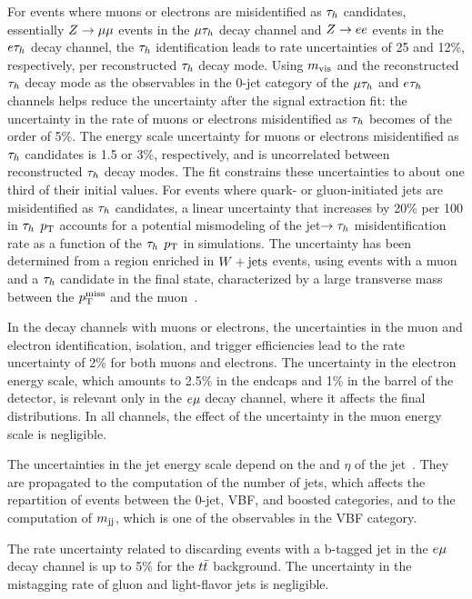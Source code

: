 For events where muons or electrons are misidentified as $\tau_{h}$ candidates, essentially $Z\to \mu\mu$ events in 
the $\mu\tau_{h}$ decay channel and $Z\to ee$ events in the $e\tau_{h}$ decay channel, the $\tau_{h}$ identification leads 
to rate uncertainties of 25 and 12\%, respectively, per reconstructed $\tau_{h}$ decay mode. Using $m_\text{vis}$ and the reconstructed 
$\tau_{h}$ decay mode as the observables in the 0-jet category of the $\mu\tau_{h}$ and $e\tau_{h}$ channels helps reduce the 
uncertainty after the signal extraction fit: the uncertainty in the rate of muons or electrons misidentified as $\tau_{h}$ 
becomes of the order of 5\%. The energy scale uncertainty for muons or electrons
 misidentified as $\tau_{h}$ candidates is 1.5 or 3\%, respectively, and is uncorrelated between reconstructed $\tau_{h}$ decay
modes. The fit constrains these uncertainties to about one third of their initial values. For events where quark- or 
gluon-initiated jets are misidentified as $\tau_{h}$ candidates, a linear uncertainty that increases by 20\% per 100\GeV 
in $\tau_{h}$ $p_\mathrm{T}$ accounts for a potential mismodeling of the jet$\to\tau_{h}$ misidentification rate as a
function of the $\tau_{h}$ $p_\mathrm{T}$ in simulations. The uncertainty has been determined from a region enriched in $W+\text{jets}$ 
events, using events with a muon and a $\tau_{h}$ candidate in the final state, characterized by a large transverse mass 
between the $p_\mathrm{T}^\text{miss}$ and the muon~\cite{Khachatryan:2015dfa,CMS-PAS-TAU-16-002}.

In the decay channels with muons or electrons, the uncertainties in the muon and electron identification, isolation, and 
trigger efficiencies lead to the rate uncertainty of 2\% for both muons and electrons.
The uncertainty in the electron energy scale, which amounts to 2.5\% in the endcaps and 1\% in the barrel of the detector, 
is relevant only in the $e\mu$ decay channel, where it affects the final distributions.
In all channels, the effect of the uncertainty in the muon energy scale is negligible.

The uncertainties in the jet energy scale depend on the \pt and $\eta$ of the jet~\cite{CMS-JME-10-011}.
They are propagated to the computation of the number of jets, which affects the repartition of events between the 0-jet, 
VBF, and boosted categories, and to the computation of $m_\mathrm{jj}$, which is one of the observables in the VBF category.

The rate uncertainty related to discarding events with a b-tagged jet in the $e\mu$ decay channel is up to
5\% for the $t\bar{t}$ background. The uncertainty in the mistagging rate of gluon and light-flavor jets is negligible.

